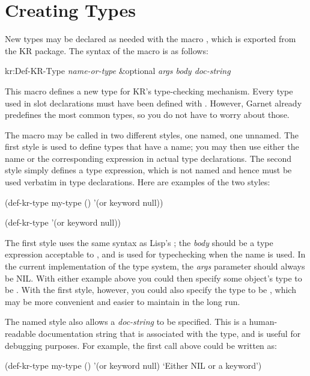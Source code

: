 \section{Creating Types}
\label{creating-types}

New types may be declared as needed with the macro ,
which is exported from the KR package.  The syntax of the macro is as
follows:

\value{f-top}
\begin{example}
kr:Def-KR-Type {\it name-or-type} \&optional {\it args body doc-string} \value{macro}
\end{example}

This macro defines a new type for KR's type-checking mechanism.  Every
type used in slot declarations must have been defined with
.  However, Garnet already predefines the most common
types, so you do not have to worry about those.

The macro may be called in two different styles, one named, one
unnamed.  The first style is used to define types that have a name; you
may then use either the name or the corresponding expression in actual
type declarations.  The second style simply defines a type expression,
which is not named and hence must be used verbatim in type
declarations.  Here are examples of the two styles:

\vspace{1 line}
\begin{programexample}
  (def-kr-type my-type () '(or keyword null))

  (def-kr-type '(or keyword null))
\end{programexample}

The first style uses the same syntax as Lisp's ; the
{\it body} should be a type expression acceptable to , and is
used for typechecking when the name is used.  In the current
implementation of the type system, the {\it args} parameter should
always be NIL.  With either example
above you could then specify some object's type to be .  With the first style, however, you could also specify the
type to be , which may be more convenient and easier to
maintain in the long run.

\begin{group}
The named style also allows a {\it doc-string} to be specified.  This is
a human-readable documentation string that is associated with the
type, and is useful for debugging purposes.  For example, the first
call above could be written as:

\vspace{1 line}
\begin{programexample}
  (def-kr-type my-type () '(or keyword null)
     `Either NIL or a keyword')
\end{programexample}
\end{group}


